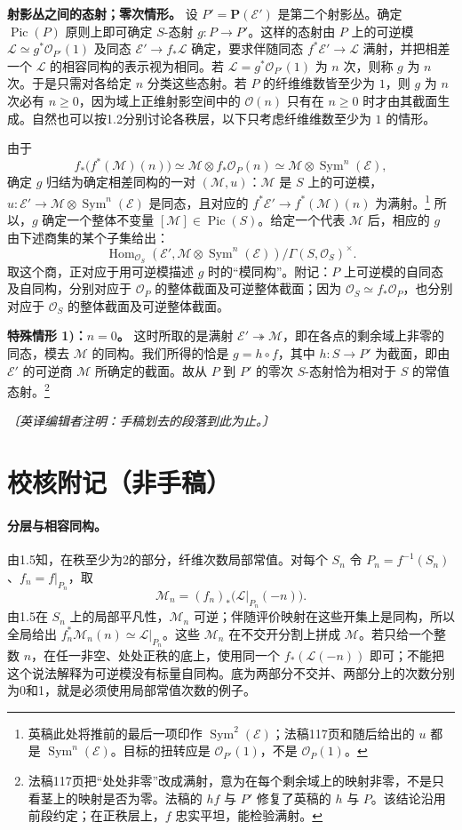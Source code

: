 \documentclass[openany,fontset=fandol]{ctexbook}
\newcommand{\OO}{\mathcal O}
\newcommand{\LL}{\mathcal L}
\newcommand{\MM}{\mathcal M}
\newcommand{\EE}{\mathcal E}
\DeclareMathOperator{\Pic}{Pic}
\DeclareMathOperator{\Sym}{Sym}
\DeclareMathOperator{\Hom}{Hom}
\begin{document}
\medskip\noindent\textbf{射影丛之间的态射；零次情形。}
设 \(P'=\mathbf P(\EE')\) 是第二个射影丛。确定 \(\Pic(P)\) 原则上即可确定 \(S\)-态射 \(g:P\to P'\)。这样的态射由 \(P\) 上的可逆模 \(\LL\simeq g^*\OO_{P'}(1)\) 及同态 \(\EE'\to f_*\LL\) 确定，要求伴随同态 \(f^*\EE'\to\LL\) 满射，并把相差一个 \(\LL\) 的相容同构的表示视为相同。若 \(\LL=g^*\OO_{P'}(1)\) 为 \(n\) 次，则称 \(g\) 为 \(n\) 次。于是只需对各给定 \(n\) 分类这些态射。若 \(P\) 的纤维维数皆至少为 \(1\)，则 \(g\) 为 \(n\) 次必有 \(n\ge0\)，因为域上正维射影空间中的 \(\OO(n)\) 只有在 \(n\ge0\) 时才由其截面生成。自然也可以按1.2分别讨论各秩层，以下只考虑纤维维数至少为 \(1\) 的情形。

由于
\[
 f_*\bigl(f^*(\MM)(n)\bigr)
   \simeq \MM\otimes f_*\OO_P(n)
   \simeq \MM\otimes\Sym^n(\EE),
\]
确定 \(g\) 归结为确定相差同构的一对 \((\MM,u)\)：\(\MM\) 是 \(S\) 上的可逆模，\(u:\EE'\to\MM\otimes\Sym^n(\EE)\) 是同态，且对应的 \(f^*\EE'\to f^*(\MM)(n)\) 为满射。\footnote{英稿此处将推前的最后一项印作 \(\Sym^2(\EE)\)；法稿117页和随后给出的 \(u\) 都是 \(\Sym^n(\EE)\)。目标的扭转应是 \(\OO_{P'}(1)\)，不是 \(\OO_P(1)\)。}
所以，\(g\) 确定一个整体不变量 \([\MM]\in\Pic(S)\)。给定一个代表 \(\MM\) 后，相应的 \(g\) 由下述商集的某个子集给出：
\[
 \Hom_{\OO_S}(\EE',\MM\otimes\Sym^n(\EE))
   \big/\Gamma(S,\OO_S)^\times .
\]
取这个商，正对应于用可逆模描述 \(g\) 时的“模同构”。附记：\(P\) 上可逆模的自同态及自同构，分别对应于 \(\OO_P\) 的整体截面及可逆整体截面；因为 \(\OO_S\simeq f_*\OO_P\)，也分别对应于 \(\OO_S\) 的整体截面及可逆整体截面。

\medskip\noindent\textbf{特殊情形 1)：\(n=0\)。}
这时所取的是满射 \(\EE'\twoheadrightarrow\MM\)，即在各点的剩余域上非零的同态，模去 \(\MM\) 的同构。我们所得的恰是 \(g=h\circ f\)，其中 \(h:S\to P'\) 为截面，即由 \(\EE'\) 的可逆商 \(\MM\) 所确定的截面。故从 \(P\) 到 \(P'\) 的零次 \(S\)-态射恰为相对于 \(S\) 的常值态射。\footnote{法稿117页把“处处非零”改成满射，意为在每个剩余域上的映射非零，不是只看茎上的映射是否为零。法稿的 \(hf\) 与 \(P'\) 修复了英稿的 \(h\) 与 \(P\)。该结论沿用前段约定；在正秩层上，\(f\) 忠实平坦，能检验满射。}

\emph{〔英译编辑者注明：手稿划去的段落到此为止。〕}

\section*{校核附记（非手稿）}
\paragraph{分层与相容同构。}
由1.5知，在秩至少为2的部分，纤维次数局部常值。对每个 \(S_n\) 令 \(P_n=f^{-1}(S_n)\)、\(f_n=f|_{P_n}\)，取
\[
\MM_n=(f_n)_*\bigl(\LL|_{P_n}(-n)\bigr).
\]
由1.5在 \(S_n\) 上的局部平凡性，\(\MM_n\) 可逆；伴随评价映射在这些开集上是同构，所以全局给出 \(f_n^*\MM_n(n)\simeq\LL|_{P_n}\)。这些 \(\MM_n\) 在不交开分割上拼成 \(\MM\)。若只给一个整数 \(n\)，在任一非空、处处正秩的底上，使用同一个 \(f_*(\LL(-n))\) 即可；不能把这个说法解释为可逆模没有标量自同构。底为两部分不交并、两部分上的次数分别为0和1，就是必须使用局部常值次数的例子。
\end{document}
